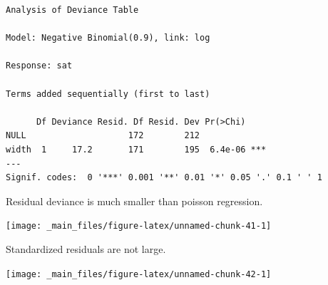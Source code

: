 \documentclass[]{book}
\newenvironment{Shaded}{\begin{snugshade}}{\end{snugshade}}
\newcommand{\DataTypeTok}[1]{\textcolor[rgb]{0.13,0.29,0.53}{#1}}
\newcommand{\FloatTok}[1]{\textcolor[rgb]{0.00,0.00,0.81}{#1}}
\newcommand{\KeywordTok}[1]{\textcolor[rgb]{0.13,0.29,0.53}{\textbf{#1}}}
\newcommand{\NormalTok}[1]{#1}
\newcommand{\OperatorTok}[1]{\textcolor[rgb]{0.81,0.36,0.00}{\textbf{#1}}}
\newcommand{\StringTok}[1]{\textcolor[rgb]{0.31,0.60,0.02}{#1}}
\begin{document}
\begin{verbatim}
Analysis of Deviance Table

Model: Negative Binomial(0.9), link: log

Response: sat

Terms added sequentially (first to last)

      Df Deviance Resid. Df Resid. Dev Pr(>Chi)    
NULL                    172        212             
width  1     17.2       171        195  6.4e-06 ***
---
Signif. codes:  0 '***' 0.001 '**' 0.01 '*' 0.05 '.' 0.1 ' ' 1
\end{verbatim}

Residual deviance is much smaller than poisson regression.

\begin{Shaded}
\end{Shaded}

\begin{center}\texttt{[image: \_main\_files/figure-latex/unnamed-chunk-41-1]} \end{center}

Standardized residuals are not large.

\begin{Shaded}
\end{Shaded}

\begin{center}\texttt{[image: \_main\_files/figure-latex/unnamed-chunk-42-1]} \end{center}
\end{document}
